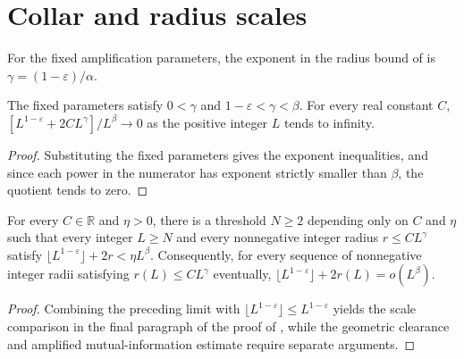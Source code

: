 \section{Collar and radius scales}

\begin{definition}
    \label{def:area_law_radius_exponent}
    \leanok
    For the fixed amplification parameters, the exponent in the radius bound of
    \cite[Proposition~10.2]{OpenAI2026AreaLaw} is
    $\gamma=(1-\varepsilon)/\alpha$.
\end{definition}

\begin{lemma}
    \label{thm:area_law_radius_exponent_gaps}
    \leanok
    The fixed parameters satisfy $0<\gamma$ and
    $1-\varepsilon<\gamma<\beta$. For every real constant $C$,
    $[L^{1-\varepsilon}+2CL^\gamma]/L^\beta\to0$
    as the positive integer $L$ tends to infinity.
\end{lemma}
\begin{proof}
    \leanok
    Substituting the fixed parameters gives the exponent inequalities, and
    since each power in the numerator has exponent strictly smaller than $\beta$,
    the quotient tends to zero.
\end{proof}

\begin{lemma}
    \label{thm:area_law_uniform_collar_threshold}
    \leanok
    For every $C\in\mathbb R$ and $\eta>0$, there is a threshold $N\ge2$ depending
    only on $C$ and $\eta$ such that
    every integer $L\ge N$ and every nonnegative integer radius
    $r\le CL^\gamma$ satisfy
    $\lfloor L^{1-\varepsilon}\rfloor+2r<\eta L^\beta$.
    Consequently, for every sequence of nonnegative integer radii satisfying
    $r(L)\le CL^\gamma$ eventually,
    $\lfloor L^{1-\varepsilon}\rfloor+2r(L)=o(L^\beta)$.
\end{lemma}
\begin{proof}
    \leanok
    Combining the preceding limit with
    $\lfloor L^{1-\varepsilon}\rfloor\le L^{1-\varepsilon}$ yields the scale
    comparison in the final paragraph of the proof of
    \cite[Proposition~10.2]{OpenAI2026AreaLaw}, while the geometric clearance and
    amplified mutual-information estimate require separate arguments.
\end{proof}

